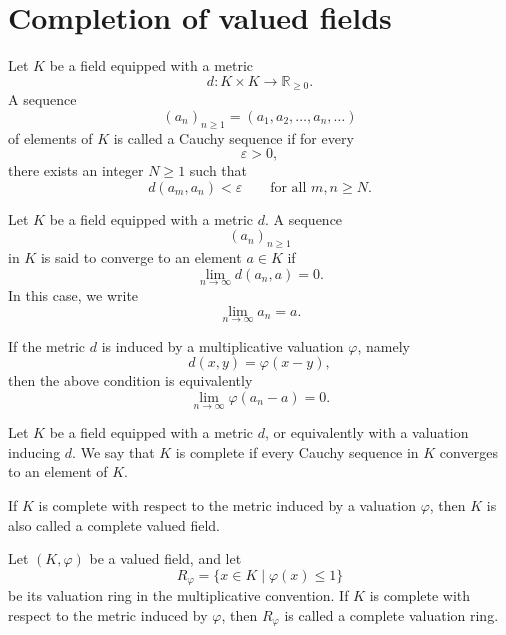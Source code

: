\section{Completion of valued fields}

\begin{definition}
    Let \(K\) be a field equipped with a metric
    \[
        d:K\times K\longrightarrow \mathbb{R}_{\geq 0}.
    \]
    A sequence
    \[
        (a_n)_{n\geq 1}=(a_1,a_2,\dots,a_n,\dots)
    \]
    of elements of \(K\) is called a Cauchy sequence if for every
    \[
        \varepsilon>0,
    \]
    there exists an integer \(N\geq 1\) such that
    \[
        d(a_m,a_n)<\varepsilon
        \qquad
        \text{for all } m,n\geq N.
    \]
\end{definition}

\begin{definition}
    Let \(K\) be a field equipped with a metric \(d\). A sequence
    \[
        (a_n)_{n\geq 1}
    \]
    in \(K\) is said to converge to an element \(a\in K\) if
    \[
        \lim_{n\to\infty} d(a_n,a)=0.
    \]
    In this case, we write
    \[
        \lim_{n\to\infty} a_n=a.
    \]

    If the metric \(d\) is induced by a multiplicative valuation \(\varphi\), namely
    \[
        d(x,y)=\varphi(x-y),
    \]
    then the above condition is equivalently
    \[
        \lim_{n\to\infty} \varphi(a_n-a)=0.
    \]
\end{definition}

\begin{definition}
    Let \(K\) be a field equipped with a metric \(d\), or equivalently with a
    valuation inducing \(d\). We say that \(K\) is complete if every Cauchy
    sequence in \(K\) converges to an element of \(K\).

    If \(K\) is complete with respect to the metric induced by a valuation
    \(\varphi\), then \(K\) is also called a complete valued field.
\end{definition}

\begin{definition}
    Let \((K,\varphi)\) be a valued field, and let
    \[
        R_{\varphi}=\{x\in K\mid \varphi(x)\leq 1\}
    \]
    be its valuation ring in the multiplicative convention.
    If \(K\) is complete with respect to the metric induced by \(\varphi\), then
    \(R_{\varphi}\) is called a complete valuation ring.
\end{definition}

